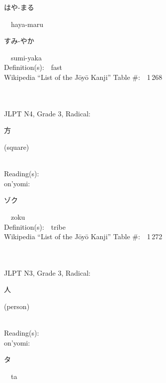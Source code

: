 \begin{multicols}{2}
{\hspace*{2em}}{\begin{CJK}{UTF8}{min} はや-まる \end{CJK}}\ \ haya-maru\ \ \\
{\hspace*{2em}}{\begin{CJK}{UTF8}{min} すみ-やか \end{CJK}}\ \ sumi-yaka\ \ \\
Definition(s):\ \ fast \\
Wikipedia ``List of the J\=oy\=o Kanji'' Table \#:\ \ 1\,268 \\
\ \ \\
{\fontsize{34pt}{40pt}  }\ \ \\  %
{JLPT N4, Grade 3, Radical:\ \ {\begin{CJK}{UTF8}{min} 方 \end{CJK}} (square) } \\
Reading(s):\ \ \\
{\hspace*{1em}}on'yomi:\ \ \\
{\hspace*{2em}}{\begin{CJK}{UTF8}{min} ゾク \end{CJK}}\ \ zoku\ \ \\
Definition(s):\ \ tribe \\
Wikipedia ``List of the J\=oy\=o Kanji'' Table \#:\ \ 1\,272 \\
\ \ \\
{\fontsize{34pt}{40pt}  }\ \ \\  %
{JLPT N3, Grade 3, Radical:\ \ {\begin{CJK}{UTF8}{min} 人 \end{CJK}} (person) } \\
Reading(s):\ \ \\
{\hspace*{1em}}on'yomi:\ \ \\
{\hspace*{2em}}{\begin{CJK}{UTF8}{min} タ \end{CJK}}\ \ ta\ \ \\

\end{multicols}
